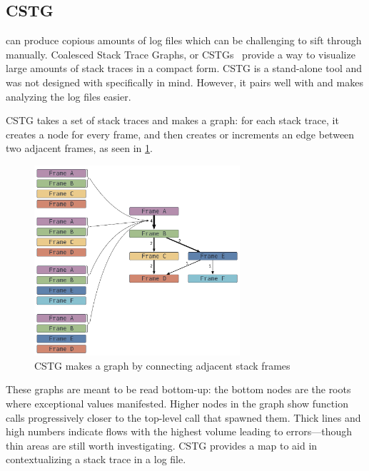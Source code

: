 \documentclass{juliacon}
\begin{document}
\subsection{CSTG}
\label{s:cstg}

\FT{} can produce copious amounts of log files which can be challenging to sift through manually.
Coalesced Stack Trace Graphs, or CSTGs~\cite{humphreySystematicDebuggingMethods2014} provide a way to visualize large amounts of stack traces in a compact form.
CSTG is a stand-alone tool and was not designed with \FT{} specifically in mind.
However, it pairs well with \FT{} and makes analyzing the log files easier.

CSTG takes a set of stack traces and makes a graph: for each stack trace, it creates a node for every frame, and then creates or increments an edge between two adjacent frames, as seen in \cref{fig:cstg_demo}.

\begin{figure}[t]
  \centering
  \includegraphics[width=3in]{./fig/cstg_static_diagram.png}
  \caption{CSTG makes a graph by connecting adjacent stack frames}
  \label{fig:cstg_demo}
\end{figure}

These graphs are meant to be read bottom-up: the bottom nodes are the roots where exceptional values manifested.
Higher nodes in the graph show function calls progressively closer to the top-level call that spawned them.
Thick lines and high numbers indicate flows with the highest volume leading to errors---though thin areas are still worth investigating.
CSTG provides a map to aid in contextualizing a stack trace in a log file.

\subsection{\GPUFPX{}}
\label{s:gpufpx}
\end{document}
